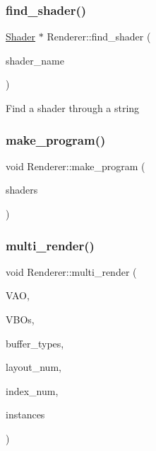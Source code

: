 \subsubsection{\texorpdfstring{find\+\_\+shader()}{find\_shader()}}
{\footnotesize\ttfamily \mbox{\hyperlink{classShader}{Shader}} $\ast$ Renderer\+::find\+\_\+shader (\begin{DoxyParamCaption}\item[{string}]{shader\+\_\+name }\end{DoxyParamCaption})}

Find a shader through a string \mbox{\label{classRenderer_a25a35d48716bd7c096f90cc5eabc2fc6}} 
\subsubsection{\texorpdfstring{make\+\_\+program()}{make\_program()}}
{\footnotesize\ttfamily void Renderer\+::make\+\_\+program (\begin{DoxyParamCaption}\item[{vector$<$ uint $>$ $\ast$}]{shaders }\end{DoxyParamCaption})}

\mbox{\label{classRenderer_aa0941d2b58991dabe9231ee2c657c36f}} 
\subsubsection{\texorpdfstring{multi\+\_\+render()}{multi\_render()}}
{\footnotesize\ttfamily void Renderer\+::multi\+\_\+render (\begin{DoxyParamCaption}\item[{G\+Luint}]{V\+AO,  }\item[{vector$<$ G\+Luint $>$ $\ast$}]{V\+B\+Os,  }\item[{vector$<$ G\+Luint $>$ $\ast$}]{buffer\+\_\+types,  }\item[{G\+Luint}]{layout\+\_\+num,  }\item[{G\+Luint}]{index\+\_\+num,  }\item[{G\+Luint}]{instances }\end{DoxyParamCaption})}

